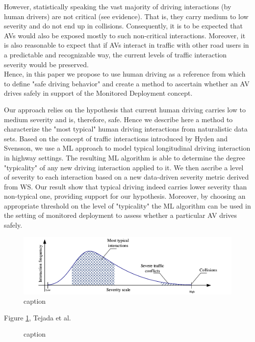 However, statistically speaking the vast majority of driving interactions (by human drivers) are not critical (see evidence). That is, they carry medium to low severity and do not end up in collisions. Consequently, it is to be expected that AVs would also be exposed mostly to such non-critical interactions. Moreover, it is also reasonable to expect that if AVs interact in traffic with other road users in a predictable and recognizable way, the current levels of traffic interaction severity would be preserved.\\

Hence, in this paper we propose to use human driving as a reference from which to define "safe driving behavior" and create a method to ascertain whether an AV drives safely in support of the Monitored Deployment concept. 



Our approach relies on the  hypothesis that current human driving carries low to medium severity and is, therefore, safe. Hence we describe here a method to characterize the "most typical" human driving interactions from naturalistic data sets. Based on the concept of traffic interactions introduced by Hyden and Svensson,  we use a ML approach to model typical longitudinal driving interaction in highway settings. The resulting ML algorithm is able to determine the degree "typicality" of any new driving interaction applied to it. We then ascribe a level of severity to each interaction based on a new  data-driven severity metric derived from WS. Our result show that typical driving indeed carries lower severity than non-typical one, providing support for our hypothesis. Moreover, by choosing an appropriate threshold on the level of "typicality" the ML algorithm can be used in the setting of monitored deployment to assess whether a particular AV drives safely.


\begin{figure}
\includegraphics[width=1.0\linewidth]{figs/interactions}
\caption{caption}
\label{fig:interactions}
\end{figure}

Figure \ref{fig:interactions}, Tejada et al. \cite{tejada2020safe}

\begin{figure}
\caption{caption}
\end{figure}